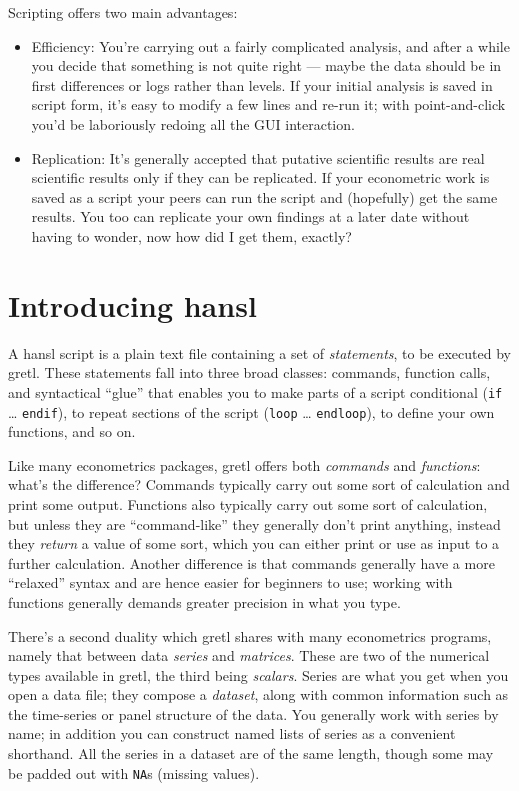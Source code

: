 Scripting offers two main advantages:

\begin{itemize}
\item Efficiency: You're carrying out a fairly complicated analysis,
  and after a while you decide that something is not quite right ---
  maybe the data should be in first differences or logs rather than
  levels. If your initial analysis is saved in script form, it's easy
  to modify a few lines and re-run it; with point-and-click you'd be
  laboriously redoing all the GUI interaction.
\item Replication: It's generally accepted that putative scientific
  results are real scientific results only if they can be replicated.
  If your econometric work is saved as a script your peers can run the
  script and (hopefully) get the same results. You too can replicate
  your own findings at a later date without having to wonder, now how
  did I get them, exactly? 
\end{itemize}

\section{Introducing hansl}

A hansl script is a plain text file containing a set of
\textsl{statements}, to be executed by gretl. These statements fall
into three broad classes: commands, function calls, and syntactical
``glue'' that enables you to make parts of a script conditional
(\texttt{if} \dots{} \texttt{endif}), to repeat sections of the script
(\texttt{loop} \dots{} \texttt{endloop}), to define your own
functions, and so on.

Like many econometrics packages, gretl offers both \textsl{commands}
and \textsl{functions}: what's the difference? Commands typically
carry out some sort of calculation and print some output. Functions
also typically carry out some sort of calculation, but unless they are
``command-like'' they generally don't print anything, instead they
\textsl{return} a value of some sort, which you can either print or
use as input to a further calculation. Another difference is that
commands generally have a more ``relaxed'' syntax and are hence easier
for beginners to use; working with functions generally demands greater
precision in what you type.

There's a second duality which gretl shares with many econometrics
programs, namely that between data \textsl{series} and
\textsl{matrices}. These are two of the numerical types available in
gretl, the third being \textsl{scalars}. Series are what you get when
you open a data file; they compose a \textsl{dataset}, along with
common information such as the time-series or panel structure of the
data. You generally work with series by name; in addition you can
construct named lists of series as a convenient shorthand. All the
series in a dataset are of the same length, though some may be padded
out with \texttt{NA}s (missing values). 




      

